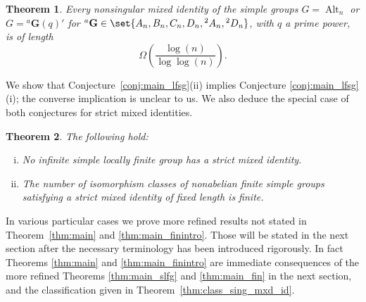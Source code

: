 \documentclass[a4paper,12pt]{amsproc}
\DeclareMathOperator{\Alt}{Alt}%
\theoremstyle{plain}
\newtheorem{thmintro}{Theorem}
\theoremstyle{definition}
\begin{document}
\begin{thmintro} \label{thm:rank_bound}
Every nonsingular mixed identity of the simple groups $G=\Alt_n$ or $G={}^a \mathbf G(q)'$ for ${}^a \mathbf{G}\in\set{A_n, B_n, C_n, D_n, {}^2A_n, {}^2D_n}$, with $q$ a prime power, is of length $$\Omega\left(\frac{\log(n)}{\log\log(n)} \right).$$
\end{thmintro}

We show that Conjecture~\ref{conj:main_lfsg}(ii) implies Conjecture \ref{conj:main_lfsg}(i); the converse implication is unclear to us. We also deduce the special case of both conjectures for strict mixed identities.

\begin{thmintro} \label{thm:strictsimpleintro}
The following hold:
\begin{enumerate}[(i)]
\item No infinite simple locally finite group has a strict mixed identity.
\item The number of isomorphism classes of nonabelian finite simple groups satisfying a strict mixed identity of fixed length is finite.
\end{enumerate}
\end{thmintro}

\medskip

In various particular cases we prove more refined results not stated in Theorem~\ref{thm:main} and \ref{thm:main_finintro}. Those will be stated in the next section after the necessary terminology has been introduced rigorously. In fact Theorems \ref{thm:main} and \ref{thm:main_finintro} are immediate consequences of the more refined Theorems \ref{thm:main_slfg} and \ref{thm:main_fin} in the next section, and the classification given in Theorem~\ref{thm:class_sing_mxd_id}.

\medskip
\end{document}
